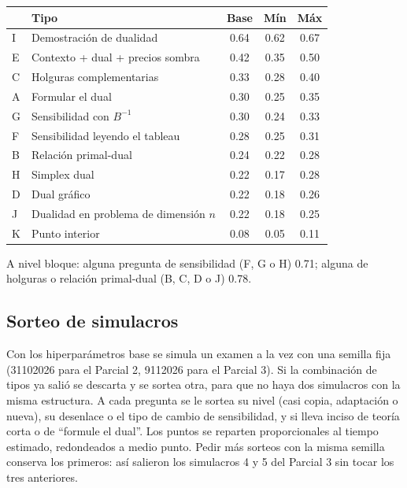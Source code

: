 \documentclass[11pt]{article}
\begin{document}
\begin{center}
\small
\begin{tabular}{llccc}
\toprule
& Tipo & Base & Mín & Máx \\
\midrule
I & Demostración de dualidad & 0.64 & 0.62 & 0.67 \\
E & Contexto + dual + precios sombra & 0.42 & 0.35 & 0.50 \\
C & Holguras complementarias & 0.33 & 0.28 & 0.40 \\
A & Formular el dual & 0.30 & 0.25 & 0.35 \\
G & Sensibilidad con $B^{-1}$ & 0.30 & 0.24 & 0.33 \\
F & Sensibilidad leyendo el tableau & 0.28 & 0.25 & 0.31 \\
B & Relación primal-dual & 0.24 & 0.22 & 0.28 \\
H & Simplex dual & 0.22 & 0.17 & 0.28 \\
D & Dual gráfico & 0.22 & 0.18 & 0.26 \\
J & Dualidad en problema de dimensión $n$ & 0.22 & 0.18 & 0.25 \\
K & Punto interior & 0.08 & 0.05 & 0.11 \\
\bottomrule
\end{tabular}
\end{center}
A nivel bloque: alguna pregunta de sensibilidad (F, G o H) 0.71; alguna de holguras o
relación primal-dual (B, C, D o J) 0.78.

\subsection{Sorteo de simulacros}
Con los hiperparámetros base se simula un examen a la vez con una semilla fija (31102026
para el Parcial 2, 9112026 para el Parcial 3). Si la combinación de tipos ya salió se descarta
y se sortea otra, para que no haya dos simulacros con la misma estructura. A cada pregunta se
le sortea su nivel (casi copia, adaptación o nueva), su desenlace o el tipo de cambio de
sensibilidad, y si lleva inciso de teoría corta o de ``formule el dual''. Los puntos se reparten
proporcionales al tiempo estimado, redondeados a medio punto. Pedir más sorteos con la misma
semilla conserva los primeros: así salieron los simulacros 4 y 5 del Parcial 3 sin tocar los
tres anteriores.
\end{document}
